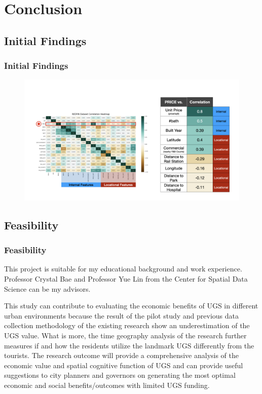 \documentclass{beamer}
\begin{document}
\section{Conclusion}
\subsection{Initial Findings}

\begin{frame}
\frametitle{Initial Findings}
\begin{figure}[h]
  \centering
  \includegraphics[width=1.0\textwidth]{Visual/heat_pre.jpeg}
\end{figure}
\end{frame}

\subsection{Feasibility}

\begin{frame}
\frametitle{Feasibility}
This project is suitable for my educational background and work experience. Professor Crystal Bae and Professor Yue Lin from the Center for Spatial Data Science can be my advisors.

This study can contribute to evaluating the economic benefits of UGS in different urban environments because the result of the pilot study and previous data collection methodology of the existing research show an underestimation of the UGS value. What is more, the time geography analysis of the research further measures if and how the residents utilize the landmark UGS differently from the tourists. The research outcome will provide a comprehensive analysis of the economic value and spatial cognitive function of UGS and can provide useful suggestions to city planners and governors on generating the most optimal economic and social benefits/outcomes with limited UGS funding. 


\end{frame}
\end{document}
